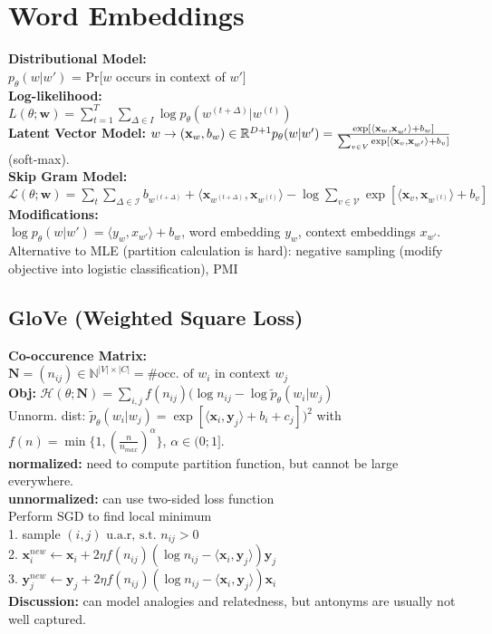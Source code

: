 \section*{Word Embeddings}
\textbf{Distributional Model:}\\
$p_\theta(w|w')$ = Pr[$w$ occurs in context of $w'$]\\
\textbf{Log-likelihood:}\\
$L(\theta; \mathbf{w}) = \sum_{t=1}^T\sum_{\Delta \in I}{\log p_\theta(w^{(t+\Delta)}|w^{(t)})}$\\
\textbf{Latent Vector Model:} $w \rightarrow (\mathbf{x}_w, b_w) \in \mathbb{R}^{D+1} \\p_{\theta}(w|w') = \frac{\exp[\langle \mathbf{x}_w,\mathbf{x}_{w'}\rangle + b_w]}{\sum_{v\in V}{\exp[\langle \mathbf{x}_v,\mathbf{x}_{w'}\rangle + b_v ]}}$ (soft-max).\\
\textbf{Skip Gram Model:}\\
$\mathcal{L}(\theta ;\mathbf{w}) = \sum_t \sum_{\Delta\in \mathcal{I}}b_{w^{(t+\Delta)}}+ \langle \mathbf{x}_{w^{(t+\Delta)}}, \mathbf{x}_{w^{(t)}}\rangle - \log \sum_{v\in \mathcal{V}} \exp [\langle \mathbf{x}_v, \mathbf{x}_{w^{(t)}} \rangle + b_v]$\\
\textbf{Modifications:}\\
$\log p_{\theta}(w|w') = \langle  y_{w} , x_{w'} \rangle + b_w$,  word embedding $y_w$, context embeddings $x_{w'}$. Alternative to MLE (partition calculation is hard): negative sampling (modify objective into logistic classification), PMI
\subsection*{GloVe (Weighted Square Loss)}
\textbf{Co-occurence Matrix:}\\
$\mathbf{N} = (n_{ij}) \in \mathbb{N}^{|V|\times|C|} = \#\text{occ. of }w_i$ in context $w_j$\\
\textbf{Obj:} $\mathcal{H}(\theta;\mathbf{N}) = \sum_{i,j} f(n_{ij})(\log n_{ij} - \log \tilde p_\theta(w_i |w_j) $\\
Unnorm. dist: $\tilde p_\theta(w_i|w_j) =\exp[\langle \mathbf{x}_i, \mathbf{y}_j \rangle + b_i + c_j])^2$
with $f(n) = \min\{1, (\frac{n}{n_{max}})^\alpha\}$, $\alpha \in (0;1]$.\\
\textbf{normalized:} need to compute partition function, but cannot be large everywhere. \\
\textbf{unnormalized: }can use two-sided loss function \\
Perform SGD to find local minimum\\
1. sample $(i,j) \text{ u.a.r, s.t. } n_{ij}>0$\\
2. $\mathbf{x}_i^{new} \leftarrow \mathbf{x}_i + 2\eta f(n_{ij})(\log n_{ij} - \langle \mathbf{x}_i, \mathbf{y}_j \rangle)\mathbf{y}_j$\\
3. $\mathbf{y}_j^{new} \leftarrow \mathbf{y}_j + 2\eta f(n_{ij})(\log n_{ij} - \langle \mathbf{x}_i, \mathbf{y}_j \rangle)\mathbf{x}_i$ \\
\textbf{Discussion:}
can model analogies and relatedness, but antonyms are usually not well captured.
